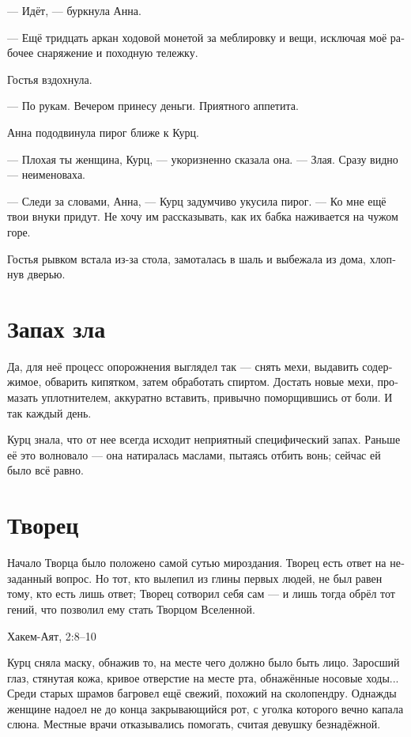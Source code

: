 \documentclass[a4paper,10pt,fleqn]{book}\usepackage{polyglossia}\setdefaultlanguage[babelshorthands=true]{russian}\setotherlanguage{english}\defaultfontfeatures{Ligatures=TeX,Mapping=tex-text}\usepackage{xcolor}\newcommand{\ml}[3]{#2}
\begin{document}
--- Идёт, --- буркнула Анна.

--- Ещё тридцать аркан ходовой монетой за меблировку и вещи, исключая моё рабочее снаряжение и походную тележку.

Гостья вздохнула.

--- По рукам.
Вечером принесу деньги.
Приятного аппетита.

Анна пододвинула пирог ближе к Курц.

--- Плохая ты женщина, Курц, --- укоризненно сказала она.
--- Злая.
Сразу видно --- неименоваха.

--- Следи за словами, Анна, --- Курц задумчиво укусила пирог.
--- Ко мне ещё твои внуки придут.
Не хочу им рассказывать, как их бабка наживается на чужом горе.

Гостья рывком встала из-за стола, замоталась в шаль и выбежала из дома, хлопнув дверью.

\section{Запах зла}

Да, для неё процесс опорожнения выглядел так --- снять мехи, выдавить содержимое, обварить кипятком, затем обработать спиртом.
Достать новые мехи, промазать уплотнителем, аккуратно вставить, привычно поморщившись от боли.
И так каждый день.

Курц знала, что от нее всегда исходит неприятный специфический запах.
Раньше её это волновало --- она натиралась маслами, пытаясь отбить вонь;
сейчас ей было всё равно.

\section{Творец}

\epigraph{Начало Творца было положено самой сутью мироздания.
Творец есть ответ на незаданный вопрос.
Но тот, кто вылепил из глины первых людей, не был равен тому, кто есть лишь ответ;
Творец сотворил себя сам --- и лишь тогда обрёл тот гений, что позволил ему стать Творцом Вселенной.}
{Хакем-Аят, 2:8--10}

Курц сняла маску, обнажив то, на месте чего должно было быть лицо.
Заросший глаз, стянутая кожа, кривое отверстие на месте рта, обнажённые носовые ходы...
Среди старых шрамов багровел ещё свежий, похожий на сколопендру.
Однажды женщине надоел не до конца закрывающийся рот, с уголка которого вечно капала слюна.
Местные врачи отказывались помогать, считая девушку безнадёжной.
\end{document}
